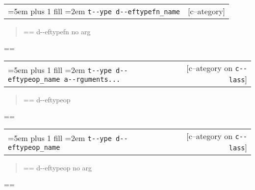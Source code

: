 \documentclass{book}
\makeatletter
\newenvironment{GNUTexinfopreformatted}{%
  \par\GNUTobeylines\obeyspaces\frenchspacing
  \parskip=\z@\parindent=\z@}{}
{\catcode`\^^M=13 \gdef\GNUTobeylines{\catcode`\^^M=13 \def^^M{\null\par}}}
\newenvironment{GNUTexinfoindented}
  {\begin{list}{}{}
  \item\relax}
  {\end{list}}
\makeatother
\begin{document}
\begin{GNUTexinfoindented}
\noindent\begin{tabularx}{\linewidth}{@{}Xr}
\rightskip=5em plus 1 fill
\hangindent=2em
\texttt{t{-}{-}ype d{-}{-}eftypefn\_name}& [c--ategory]
\end{tabularx}

%
\begin{quote}
\unskip{\parskip=0pt\noindent}%
\begin{GNUTexinfopreformatted}%
\ttfamily d{-}{-}eftypefn no arg
\end{GNUTexinfopreformatted}
\end{quote}
\begin{GNUTexinfopreformatted}%
\ttfamily 
\end{GNUTexinfopreformatted}

\noindent\begin{tabularx}{\linewidth}{@{}Xr}
\rightskip=5em plus 1 fill
\hangindent=2em
\texttt{t{-}{-}ype d{-}{-}eftypeop\_name a{-}{-}rguments...}& [c--ategory on \texttt{c{-}{-}lass}]
\end{tabularx}

%
\begin{quote}
\unskip{\parskip=0pt\noindent}%
\begin{GNUTexinfopreformatted}%
\ttfamily d{-}{-}eftypeop
\end{GNUTexinfopreformatted}
\end{quote}
\begin{GNUTexinfopreformatted}%
\ttfamily 
\end{GNUTexinfopreformatted}

\noindent\begin{tabularx}{\linewidth}{@{}Xr}
\rightskip=5em plus 1 fill
\hangindent=2em
\texttt{t{-}{-}ype d{-}{-}eftypeop\_name}& [c--ategory on \texttt{c{-}{-}lass}]
\end{tabularx}

%
\begin{quote}
\unskip{\parskip=0pt\noindent}%
\begin{GNUTexinfopreformatted}%
\ttfamily d{-}{-}eftypeop no arg
\end{GNUTexinfopreformatted}
\end{quote}
\begin{GNUTexinfopreformatted}%
\ttfamily 
\end{GNUTexinfopreformatted}


\end{GNUTexinfoindented}
\end{document}
